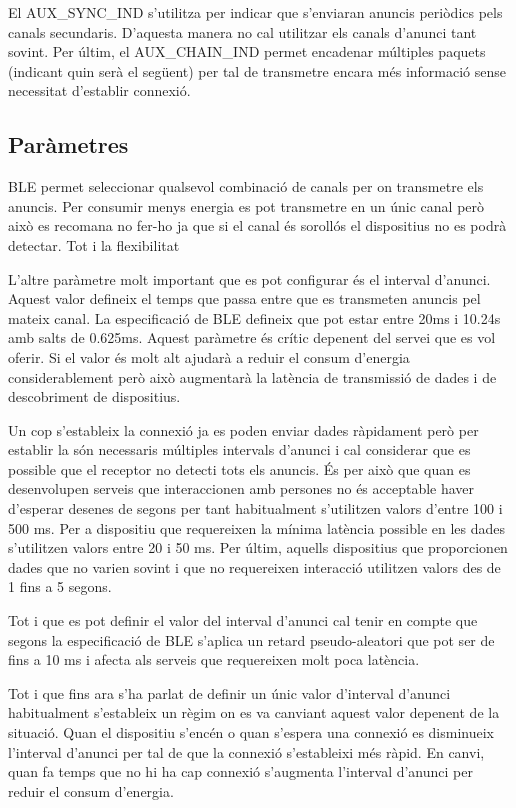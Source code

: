 El AUX\_SYNC\_IND s'utilitza per indicar que s'enviaran anuncis periòdics pels canals secundaris.
D'aquesta manera no cal utilitzar els canals d'anunci tant sovint.
Per últim, el AUX\_CHAIN\_IND permet encadenar múltiples paquets (indicant quin serà el següent) per tal de transmetre encara més informació sense necessitat d'establir connexió.

\subsection{Paràmetres}
BLE permet seleccionar qualsevol combinació de canals per on transmetre els anuncis.
Per consumir menys energia es pot transmetre en un únic canal però això es recomana no fer-ho ja que si el canal és sorollós el dispositius no es podrà detectar.
Tot i la flexibilitat

L'altre paràmetre molt important que es pot configurar és el interval d'anunci.
Aquest valor defineix el temps que passa entre que es transmeten anuncis pel mateix canal.
La especificació de BLE defineix que pot estar entre 20ms i 10.24s amb salts de 0.625ms.
Aquest paràmetre és crític depenent del servei que es vol oferir.
Si el valor és molt alt ajudarà a reduir el consum d'energia considerablement però això augmentarà la latència de transmissió de dades i de descobriment de dispositius.

Un cop s'estableix la connexió ja es poden enviar dades ràpidament però per establir la són necessaris múltiples intervals d'anunci i cal considerar que es possible que el receptor no detecti tots els anuncis. 
És per això que quan es desenvolupen serveis que interaccionen amb persones no és acceptable haver d'esperar desenes de segons per tant habitualment s'utilitzen valors d'entre 100 i 500 ms.
Per a dispositiu que requereixen la mínima latència possible en les dades s'utilitzen valors entre 20 i 50 ms.
Per últim, aquells dispositius que proporcionen dades que no varien sovint i que no requereixen interacció utilitzen valors des de 1 fins a 5 segons.

Tot i que es pot definir el valor del interval d'anunci cal tenir en compte que segons la especificació de BLE s'aplica un retard pseudo-aleatori que pot ser de fins a 10 ms i afecta als serveis que requereixen molt poca latència.

Tot i que fins ara s'ha parlat de definir un únic valor d'interval d'anunci habitualment s'estableix un règim on es va canviant aquest valor depenent de la situació.
Quan el dispositiu s'encén o quan s'espera una connexió es disminueix l'interval d'anunci per tal de que la connexió s'estableixi més ràpid.
En canvi, quan fa temps que no hi ha cap connexió s'augmenta l'interval d'anunci per reduir el consum d'energia. 


